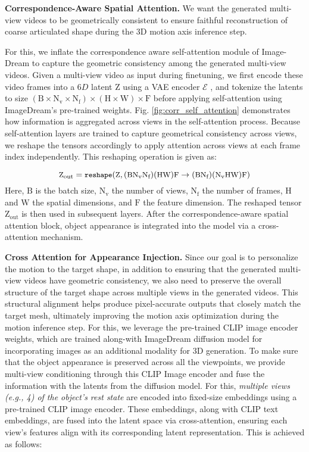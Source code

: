 \noindent \textbf{Correspondence-Aware Spatial Attention.} We want the generated multi-view videos to be geometrically consistent to ensure faithful reconstruction of coarse articulated shape during the 3D motion axis inference step. 

\noindent For this, we inflate the correspondence aware self-attention module of Image-Dream to capture the geometric consistency among the generated multi-view videos. Given a multi-view video as input during finetuning, we first encode these video frames into a $6D$ latent $\text{Z}$ using a VAE encoder $\mathcal{E}$ \cite{vae}, and tokenize the latents to size $(\text{B}\times \text{N}_{\text{v}}\times\text{N}_{\text{f}}) \times (\text{H}\times\text{W})\times\text{F}$ before applying self-attention using ImageDream’s pre-trained weights. Fig. \ref{fig:corr_self_attention} demonstrates how information is aggregated across views in the self-attention process. Because self-attention layers are trained to capture geometrical consistency across views, we reshape the tensors accordingly to apply attention across views at each frame index independently. This reshaping operation is given as:

\begin{equation}
\small
    \text{Z}_{\text{out}} = \texttt{reshape}(\text{Z}, (\text{B} \text{N}_{\text{v}} \text{N}_{\text{f}})(\text{H}\text{W})\text{F}\rightarrow(\text{B} \text{N}_{\text{f}})(\text{N}_{\text{v}}\text{H}\text{W})\text{F}) 
\end{equation}
Here,  $\text{B}$ is the batch size, $\text{N}_\text{v}$ the number of views, $\text{N}_\text{f}$ the number of frames, $\text{H}$ and $\text{W}$ the spatial dimensions, and $\text{F}$ the feature dimension. The reshaped tensor  $\text{Z}_{\text{out}}$ is then used in subsequent layers. After the correspondence-aware spatial attention block, object appearance is integrated into the model via a cross-attention mechanism.

\noindent\textbf{Cross Attention for Appearance Injection.} Since our goal is to personalize the motion to the target shape, in addition to ensuring that the generated multi-view videos have geometric consistency, we also need to preserve the overall structure of the target shape across multiple views in the generated videos. This structural alignment helps produce pixel-accurate outputs that closely match the target mesh, ultimately improving the motion axis optimization during the motion inference step. For this, we leverage the pre-trained CLIP image encoder weights, which are trained along-with ImageDream diffusion model for incorporating images as an additional modality for 3D generation. To make sure that the object appearance is preserved across all the viewpoints, we provide multi-view conditioning through this CLIP Image encoder and fuse the information with the latents from the diffusion model. For this, \emph{multiple views (e.g., 4) of the object's rest state} are encoded into fixed-size embeddings using a pre-trained CLIP image encoder. These embeddings, along with CLIP text embeddings, are fused into the latent space via cross-attention, ensuring each view's features align with its corresponding latent representation. This is achieved as follows: 

